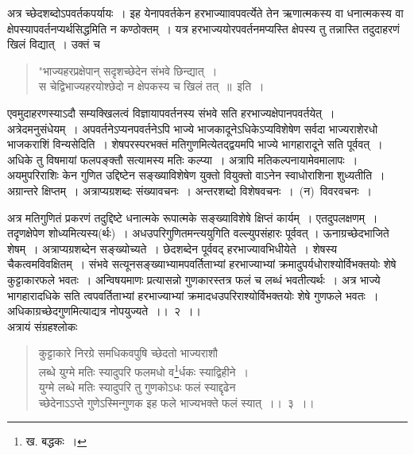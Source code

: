 \documentclass[11pt, openany]{book}
\begin{document}
\indent
अत्र च्छेदशब्दोऽपवर्तकपर्यायः~। इह येनापवर्तकेन हरभाज्याावपवर्त्येते तेन ऋणात्मकस्य वा धनात्मकस्य वा क्षेपस्यापवर्तनप्यर्थसिद्धमिति न कण्ठोक्तम्~। यत्र हरभाज्ययोरपवर्तनमप्यस्ति क्षेपस्य तु तन्नास्ति तदुदाहरणं खिलं विद्यात्~। उक्तं च \textendash

{\begin{quote}
\qt
"भाज्यहरप्रक्षेपान् सदृशच्छेदेन संभवे छिन्द्यात्~।\\
स चेद्विभाज्यहरयोश्छेदो न क्षेपकस्य च खिलं तत्~॥~इति~।
\end{quote}}

\indent
एवमुदाहरणस्याऽदौ सम्यक्खिलत्वं विज्ञायापवर्तनस्य संभवे सति हरभाज्यक्षेपानपवर्तयेत्~। अत्रेदमनुसंधेयम्~। अपवर्तनेऽप्यनपवर्तनेऽपि भाज्ये भाजकादूनेऽधिकेऽप्यविशेषेण सर्वदा भाज्यराशेरधो भाजकराशिं विन्यसेदिति~। शेषपरस्परभक्तं मतिगुणमित्येतद्द्वयमपि भाज्ये भागहारादूने सति पूर्ववत्~। अधिके तु विषमायां फलपङ्क्तौ सत्यामस्य मतिः कल्प्या~। अत्रापि मतिकल्पनायामेवमालापः~। अयमुपरिराशिः केन गुणित उद्दिष्टेन सङ्ख्याविशेषेण युक्तो वियुक्तो वाऽनेन स्वाधोराशिना शुध्यतीति~। अग्रान्तरे क्षिप्तम्~। अत्राप्यग्रशब्दः संख्यावचनः~। अन्तरशब्दो विशेषवचनः~।~(न)~विवरवचनः~।

\newpage
\thispagestyle{fancy}
\fancyhf{}

\noindent
अत्र मतिगुणितं प्रकरणं तदुद्दिष्टे धनात्मके रूपात्मके सङ्ख्याविशेषे क्षिप्तं कार्यम्~। एतदुपलक्षणम्~। तदृणक्षेपेण शोध्यमित्यस्य(र्थः)~। अधउपरिगुणितमन्त्ययुगिति वल्ल्युपसंहारः पूर्ववत् । ऊनाग्रच्छेदभाजिते शेषम्~। अत्राप्यग्रशब्देन सङ्ख्योच्यते~। छेदशब्देन पूर्ववद् हरभाज्यावभिधीयेते~। शेषस्य चैकत्वमविवक्षितम्~। संभवे सत्यूनसङ्ख्याभ्यामपवर्तिताभ्यां हरभाज्याभ्यां क्रमादुपर्यधोराश्योर्विभक्तयोः शेषे कुट्टाकारफले भवतः~। अन्विषयमाणः प्रत्यासन्नो गुणकारस्तत्र फलं च लब्धं भवतीत्यर्थः~। अत्र भाज्ये भागहारादधिके सति त्वपवर्तिताभ्यां हरभाज्याभ्यां क्रमादधउपरिराश्योर्विभक्तयोः शेषे गुणफले भवतः~।अधिकाग्रच्छेदगुणमित्याद्यत्र नोपयुज्यते~।।~२~।।\\

\indent
अत्रायं संग्रहश्लोकः\textendash
\begin{quote}
{\ks कुट्टाकारे निरग्रे समधिकवपुषि च्छेदतो भाज्यराशौ\\
लब्धे युग्मे मतिः स्यादुपरि फलमधो व\renewcommand\thefootnote{१}\footnote{ख. बद्धकः~।}र्धकः स्याद्विहीने~।\\
युग्मे लब्धे मतिः स्यादुपरि तु गुणकोऽधः फलं स्याद्दृढेन\\
च्छेदेनाऽऽप्ते गुणेऽस्मिन्गुणक इह फले भाज्यभक्ते फलं स्यात्~।।~३~।।}
\end{quote}
\end{document}
